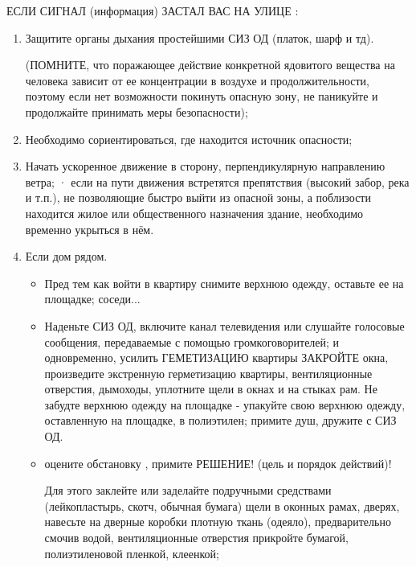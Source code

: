 \documentclass[a4paper, 12pt]{article}
\theoremstyle{definition}
\begin{document}
        ЕСЛИ СИГНАЛ (информация) ЗАСТАЛ ВАС НА УЛИЦЕ :
        \begin{enumerate}
            \item Защитите органы дыхания простейшими СИЗ ОД (платок, шарф и тд).
            
            (ПОМНИТЕ, что поражающее действие конкретной ядовитого вещества на человека зависит от ее концентрации в воздухе и продолжительности, поэтому если нет возможности покинуть опасную зону, не паникуйте и продолжайте принимать меры безопасности);
            \item Необходимо сориентироваться, где находится источник опасности; 
            \item Начать ускоренное движение в сторону, перпендикулярную направлению ветра; · если на пути движения встретятся препятствия (высокий забор, река и т.п.), не позволяющие быстро выйти из опасной зоны, а поблизости находится жилое или общественного назначения здание, необходимо временно укрыться в нём.
            \item Если дом рядом.
            
            \begin{itemize}
                \item Пред тем как войти в квартиру снимите верхнюю одежду, оставьте ее на площадке; соседи...
                \item Наденьте СИЗ ОД, включите канал  телевидения или слушайте голосовые сообщения, передаваемые с помощью громкоговорителей; и одновременно, усилить ГЕМЕТИЗАЦИЮ квартиры ЗАКРОЙТЕ окна, произведите  экстренную герметизацию квартиры, вентиляционные отверстия, дымоходы, уплотните щели в окнах и на стыках рам. Не забудте верхнюю одежду на площадке
                - упакуйте свою верхнюю одежду, оставленную на площадке, в  полиэтилен; примите душ, дружите с СИЗ ОД.
                \item оцените обстановку , примите РЕШЕНИЕ! (цель и порядок действий)!
                
                Для этого заклейте или заделайте подручными средствами (лейкопластырь, скотч, обычная бумага) щели в оконных рамах, дверях, навесьте на дверные коробки плотную ткань (одеяло), предварительно смочив водой, вентиляционные отверстия прикройте бумагой, полиэтиленовой пленкой, клеенкой;


\end{itemize}
\end{enumerate}
\end{document}
